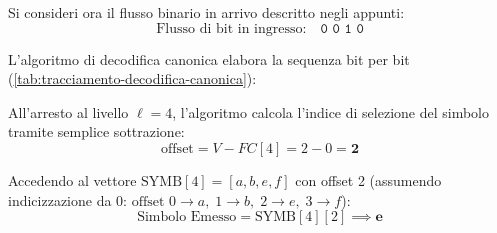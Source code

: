 Si consideri ora il flusso binario in arrivo descritto negli appunti:
\begin{equation}
  \text{Flusso di bit in ingresso:} \quad \texttt{0 0 1 0}
\end{equation}

L'algoritmo di decodifica canonica elabora la sequenza bit per bit (\autoref{tab:tracciamento-decodifica-canonica}):

\begin{table}[H]
\centering
\small
\caption{Tracciamento analitico dell'esecuzione dell'algoritmo Tree-less sulla sequenza \texttt{0 0 1 0}.}
\label{tab:tracciamento-decodifica-canonica}
\end{table}

All'arresto al livello $\ell = 4$, l'algoritmo calcola l'indice di selezione del simbolo tramite semplice sottrazione:
\begin{equation}
  \text{offset} = V - FC[4] = 2 - 0 = \mathbf{2}
\end{equation}

Accedendo al vettore $\text{SYMB}[4] = [a, b, e, f]$ con offset 2 (assumendo indicizzazione da 0: $\text{offset } 0 \to a, \; 1 \to b, \; 2 \to e, \; 3 \to f$):
\begin{equation}
  \text{Simbolo Emesso} = \text{SYMB}[4][2] \implies \mathbf{e}
\end{equation}

